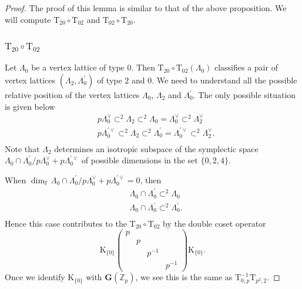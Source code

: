 \documentclass[10pt]{amsart}
\numberwithin{equation}{section}
\theoremstyle{definition}
\def\FF{\mathbb{F}}
\def\bfG{\mathbf{G}}
\def\ZZ{\mathbb{Z}}
\def\rmK{\mathrm{K}}
\def\rmT{\mathrm{T}}
\begin{document}
\begin{proof} The proof of this lemma is similar to that of the above proposition. We will compute $\rmT_{20}\circ\rmT_{02}$ and $\rmT_{02}\circ\rmT_{20}$.

\subsubsection{$\rmT_{20}\circ\rmT_{02}$}  Let $\Lambda_{0}$ be a vertex lattice of type $0$. Then $\rmT_{20}\circ\rmT_{02}(\Lambda_{0})$ classifies a pair of vertex lattices $(\Lambda_{2}, \Lambda^{\prime}_{0})$ of type $2$ and $0$. We need to understand all the possible relative position of the vertex lattices $\Lambda_{0}$, $\Lambda_{2}$ and $\Lambda^{\prime}_{0}$. The only possible situation is given below 
\begin{equation*}
\begin{aligned}
&p\Lambda^{\vee}_{0}\subset^{2}\Lambda_{2}\subset^{2} \Lambda_{0}=\Lambda^{\vee}_{0} \subset^{2} \Lambda^{\vee}_{2}\\
&p\Lambda^{\prime\vee}_{0}\subset^{2}\Lambda_{2}\subset^{2} \Lambda^{\prime}_{0}=\Lambda^{\prime\vee}_{0} \subset^{2} \Lambda^{\vee}_{2}.\\
\end{aligned}
\end{equation*}
Note that $\Lambda_{2}$ determines an isotropic subspace of the symplectic space $\Lambda_{0}\cap\Lambda^{\prime}_{0}/p\Lambda^{\vee}_{0}+p\Lambda^{\prime\vee}_{0}$ of possible dimensions in the set $\{0, 2, 4\}$.

When $\dim_{\FF}\Lambda_{0}\cap\Lambda^{\prime}_{0}/p\Lambda^{\vee}_{0}+p\Lambda^{\prime\vee}_{0}=0$, then 
\begin{equation*}
\begin{aligned}
&\Lambda_{0}\cap\Lambda^{\prime}_{0}\subset^{2} \Lambda_{0}\\ 
&\Lambda_{0}\cap\Lambda^{\prime}_{0}\subset^{2} \Lambda^{\prime}_{0}.\\ 
\end{aligned}
\end{equation*}
Hence this case contributes to the $\rmT_{20}\circ\rmT_{02}$ by the double coset operator
\begin{equation*}
\rmK_{\{0\}}\begin{pmatrix}p&&&\\&p&&\\&&p^{-1}&\\&&&p^{-1} \end{pmatrix}\rmK_{\{0\}}.
\end{equation*}
Once we identify $\rmK_{\{0\}}$ with $\bfG(\ZZ_{p})$, we see this is the same as $\mathrm{T}^{-1}_{0,p}\rmT_{p^{2}, 2}$.


\end{proof}
\end{document}
